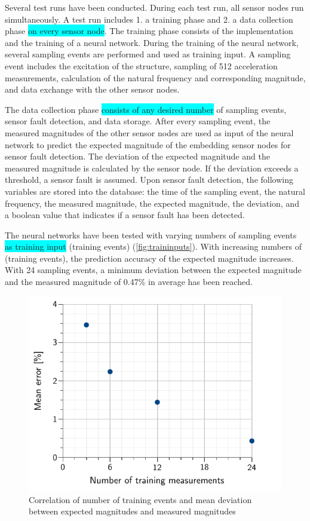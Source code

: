 \documentclass[12pt,a4paper]{scrartcl}
\begin{document}
Several test runs have been conducted.
During each test run, all sensor nodes run simultaneously.
A test run includes 1. a training phase and 2. a data collection phase \colorbox{cyan}{on every sensor node}.
The training phase consists of the implementation and the training of a neural network.
During the training of the neural network, several sampling events are performed and used as training input.
A sampling event includes the excitation of the structure, sampling of 512 acceleration measurements, calculation of the natural frequency and corresponding magnitude, and data exchange with the other sensor nodes.

The data collection phase \colorbox{cyan}{consists of any desired number} of sampling events, sensor fault detection, and data storage.
After every sampling event, the measured magnitudes of the other sensor nodes are used as input of the neural network to predict the expected magnitude of the embedding sensor nodes for sensor fault detection.
The deviation of the expected magnitude and the measured magnitude is calculated by the sensor node.
If the deviation exceeds a threshold, a sensor fault is assumed.
Upon sensor fault detection, the following variables are stored into the database: the time of the sampling event, the natural frequency, the measured magnitude, the expected magnitude, the deviation,  and a boolean value that indicates if a sensor fault has been detected.

The neural networks have been tested with varying numbers of sampling events \colorbox{cyan}{as training input} (training events) (\autoref{fig:traininputs}).
With increasing numbers of (training events), the prediction accuracy of the expected magnitude increases.
With 24 sampling events, a minimum deviation between the expected magnitude and the measured magnitude of 0.47\% in average has been reached.

\begin{figure}[htb]
    \centering
    \includegraphics{figures/traininputs.pdf}
    \caption{Correlation of number of training events and mean deviation between expected magnitudes and measured magnitudes}
    \label{fig:traininputs}
\end{figure}
\end{document}
